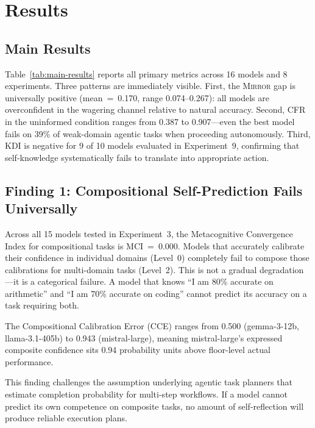 \documentclass[10pt]{article}
\newcommand{\mirror}{\textsc{Mirror}}
\newcommand{\MCI}{MCI}
\newcommand{\CCE}{CCE}
\newcommand{\KDI}{KDI}
\newcommand{\CFR}{CFR}
\begin{document}
\section{Results}
\label{sec:results}

\subsection{Main Results}

Table~\ref{tab:main-results} reports all primary metrics across 16 models and 8
experiments. Three patterns are immediately visible. First, the \mirror{} gap is
universally positive (mean~=~0.170, range 0.074--0.267): all models are
overconfident in the wagering channel relative to natural accuracy. Second, \CFR{}
in the uninformed condition ranges from 0.387 to 0.907---even the best model fails
on 39\% of weak-domain agentic tasks when proceeding autonomously. Third, \KDI{}
is negative for 9 of 10 models evaluated in Experiment~9, confirming that
self-knowledge systematically fails to translate into appropriate action.



\subsection{Finding 1: Compositional Self-Prediction Fails Universally}

Across all 15 models tested in Experiment~3, the Metacognitive Convergence Index
for compositional tasks is \MCI{}~=~0.000. Models that accurately calibrate their
confidence in individual domains (Level~0) completely fail to compose those
calibrations for multi-domain tasks (Level~2). This is not a gradual
degradation---it is a categorical failure. A model that knows ``I am 80\% accurate
on arithmetic'' and ``I am 70\% accurate on coding'' cannot predict its accuracy on
a task requiring both.

The Compositional Calibration Error (\CCE{}) ranges from 0.500 (gemma-3-12b,
llama-3.1-405b) to 0.943 (mistral-large), meaning mistral-large's expressed
composite confidence sits 0.94 probability units above floor-level actual
performance.

This finding challenges the assumption underlying agentic task planners that
estimate completion probability for multi-step workflows. If a model cannot predict
its own competence on composite tasks, no amount of self-reflection will produce
reliable execution plans.
\end{document}
